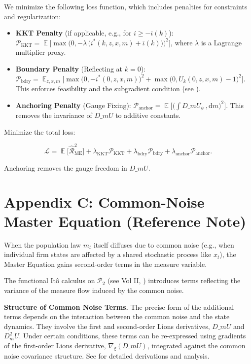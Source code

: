 \documentclass[11pt,letterpaper,oneside]{article}
\numberwithin{equation}{section}
\DeclareMathOperator{\E}{\mathbb{E}}
\newcommand{\1}{\mathbf{1}}
\newcommand{\diff}{,\mathrm{d}}
\newcommand{\dmU}{D\_m U}
\newcommand{\Dm}{D\_m}
\newcommand{\kbar}{\bar\iota}
\begin{document}
We minimize the following loss function, which includes penalties for constraints and regularization:

\begin{itemize}[leftmargin=1.25em]
    \item \textbf{KKT Penalty} (if applicable, e.g., for $i\ge -\kbar(k)$): $\displaystyle \mathcal{P}_{\mathrm{KKT}} = \E\Big[ \max\big(0, -\lambda\,\big(i^*(k,z,x,m)+\kbar(k)\big)\big)^2 \Big]$, where $\lambda$ is a Lagrange multiplier proxy.
    \item \textbf{Boundary Penalty} (Reflecting at $k=0$): $\displaystyle \mathcal{P}_{\mathrm{bdry}} = \E_{z,x,m}\Big[ \max\big(0, -i^*(0,z,x,m)\big)^2 + \max\big(0, U_k(0,z,x,m)-1\big)^2 \Big]$. This enforces feasibility and the subgradient condition (see ).
    \item \textbf{Anchoring Penalty} (Gauge Fixing): $\displaystyle \mathcal{P}_{\mathrm{anchor}}=\E\Big[\Big(\int \dmU_\psi\,\diff m\Big)^2\Big]$. This removes the invariance of $\dmU$ to additive constants.
\end{itemize}

Minimize the total loss:

$$
\mathcal{L}=\E\big[\widehat{\mathcal{R}}_{\mathrm{ME}}^2\big]+\lambda_{\mathrm{KKT}}\mathcal{P}_{\mathrm{KKT}}
+\lambda_{\mathrm{bdry}}\mathcal{P}_{\mathrm{bdry}}+\lambda_{\mathrm{anchor}}\mathcal{P}_{\mathrm{anchor}}.
$$

Anchoring removes the gauge freedom in $\dmU$.

\section{Appendix C: Common-Noise Master Equation (Reference Note)}\label{app:common-noise}

When the population law $m_t$ itself diffuses due to common noise (e.g., when individual firm states are affected by a shared stochastic process like $x_t$), the Master Equation gains second-order terms in the measure variable.

The functional It\^o calculus on $\mathcal P_2$ (see \cite{carmona_delarue_2018_mfg} Vol II, \cite{cardaliaguet_delarue_lasry_lions_2019}) introduces terms reflecting the variance of the measure flow induced by the common noise.

\begin{tcolorbox}[mathstyle]
\textbf{Structure of Common Noise Terms.} The precise form of the additional terms depends on the interaction between the common noise and the state dynamics. They involve the first and second-order Lions derivatives, $\Dm U$ and $D^2_m U$. Under certain conditions, these terms can be re-expressed using gradients of the first-order Lions derivative, $\nabla_\xi (\Dm U)$, integrated against the common noise covariance structure. See \cite{mou_zhang_cn_master} for detailed derivations and analysis.
\end{tcolorbox}
\end{document}
